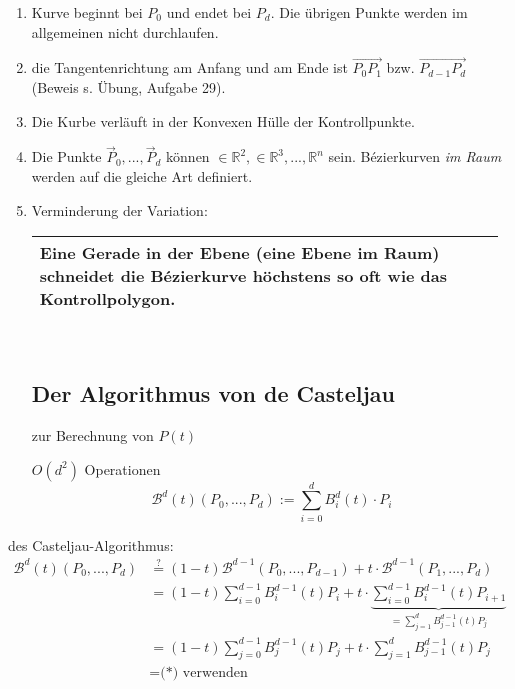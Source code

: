 \begin{enumerate}
 \item Kurve beginnt bei $P_0$ und endet bei $P_d$. Die übrigen Punkte werden im allgemeinen nicht durchlaufen.
 \item die Tangentenrichtung am Anfang und am Ende ist $\overrightarrow{P_0P_1}$ bzw.
	$\overrightarrow{P_{d-1}P_d}$ (Beweis s. Übung, Aufgabe 29).
 \item Die Kurbe verläuft in der Konvexen Hülle der Kontrollpunkte.
	\begin{center}
	\end{center}
 \item Die Punkte $\vec P_0, ..., \vec P_d$ können $\in \mathbb{R}^2, \in \mathbb{R}^3, ..., \mathbb{R}^n$ sein.
	Bézierkurven \emph{im Raum} werden auf die gleiche Art definiert.
 \item Verminderung der Variation:
	\begin{center}
	 \begin{tabular}{|p{0.97\linewidth}|}
	  \hline
	  Eine Gerade in der Ebene (eine Ebene im Raum) schneidet die Bézierkurve höchstens so oft wie das
	  Kontrollpolygon.\\
	  \hline
	 \end{tabular}\\
	\end{center}
\subsection{Der Algorithmus von de Casteljau}
zur Berechnung von $P(t)$
\begin{center}
\end{center}
$O(d^2)$ Operationen
\[\mathcal B^d(t)(P_0,...,P_d) := \sum\limits_{i=0}^d B_i^d(t) \cdot P_i\]
\end{enumerate}
\Bew des Casteljau-Algorithmus:
\begin{align*}
 \mathcal B^d(t)(P_0,...,P_d) &\stackrel{?}= (1-t) \mathcal B^{d-1}(P_0, ..., P_{d-1})
	+ t \cdot \mathcal B^{d-1}(P_1, ..., P_d)\\
	&= (1-t) \sum\limits_{i=0}^{d-1} B_i^{d-1}(t) P_i + t \cdot %
		 \underbrace{\sum\limits_{i=0}^{d-1} B_i^{d-1}(t) P_{i+1}}_
			{=\sum\limits_{j=1}^{d} B_{j-1}^{d-1}(t) P_j}\\
	&= (1-t) \sum\limits_{j=0}^{d-1} B_j^{d-1}(t) P_{j} + t \cdot \sum\limits_{j=1}^{d} B_{j-1}^{d-1}(t) P_j\\
	&= \text{(*) verwenden}
\end{align*}
